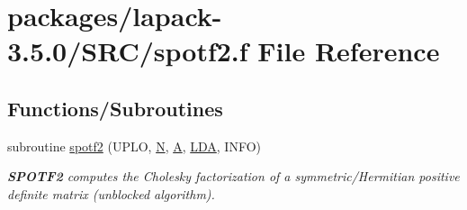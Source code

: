 \hypertarget{spotf2_8f}{}\section{packages/lapack-\/3.5.0/\+S\+R\+C/spotf2.f File Reference}
\label{spotf2_8f}
\subsection*{Functions/\+Subroutines}
\begin{DoxyCompactItemize}
\item 
subroutine \hyperlink{group__realPOcomputational_ga7f69d6c757d6063b7827c88ec912d4f0}{spotf2} (U\+P\+L\+O, \hyperlink{polmisc_8c_a0240ac851181b84ac374872dc5434ee4}{N}, \hyperlink{classA}{A}, \hyperlink{example__user_8c_ae946da542ce0db94dced19b2ecefd1aa}{L\+D\+A}, I\+N\+F\+O)
\begin{DoxyCompactList}\small\item\em {\bfseries S\+P\+O\+T\+F2} computes the Cholesky factorization of a symmetric/\+Hermitian positive definite matrix (unblocked algorithm). \end{DoxyCompactList}\end{DoxyCompactItemize}
